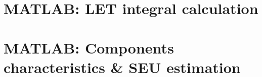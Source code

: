 \documentclass{article}
\begin{document}
\newpage				%
\begin{appendices}
    \section{\label{app:matlab:LET}MATLAB: LET integral calculation}
    
    
	\newpage    
    \section{\label{app:matlab:sigma}MATLAB: Components characteristics \& SEU estimation}
    

\end{appendices}
\end{document}
